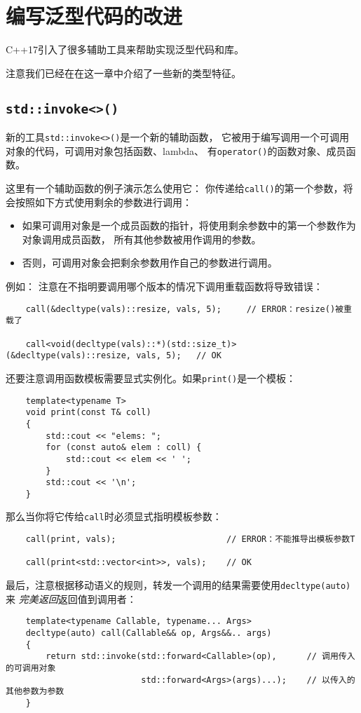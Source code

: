\chapter{编写泛型代码的改进}\label{ch33}
C++17引入了很多辅助工具来帮助实现泛型代码和库。

注意我们已经在在这一章中介绍了一些新的类型特征。


\section{\texttt{std::invoke<>()}}\label{ch33.1}
新的工具\texttt{std::invoke<>()}是一个新的辅助函数，
它被用于编写调用一个可调用对象的代码，可调用对象包括函数、lambda、
有\texttt{operator()}的函数对象、成员函数。

这里有一个辅助函数的例子演示怎么使用它：
你传递给\texttt{call()}的第一个参数，将会按照如下方式使用剩余的参数进行调用：
\begin{itemize}
    \item 如果可调用对象是一个成员函数的指针，将使用剩余参数中的第一个参数作为对象调用成员函数，
    所有其他参数被用作调用的参数。
    \item 否则，可调用对象会把剩余参数用作自己的参数进行调用。
\end{itemize}
例如：
注意在不指明要调用哪个版本的情况下调用重载函数将导致错误：
\begin{lstlisting}
    call(&decltype(vals)::resize, vals, 5);     // ERROR：resize()被重载了

    call<void(decltype(vals)::*)(std::size_t)>(&decltype(vals)::resize, vals, 5);   // OK
\end{lstlisting}
还要注意调用函数模板需要显式实例化。如果\texttt{print()}是一个模板：
\begin{lstlisting}
    template<typename T>
    void print(const T& coll)
    {
        std::cout << "elems: ";
        for (const auto& elem : coll) {
            std::cout << elem << ' ';
        }
        std::cout << '\n';
    }
\end{lstlisting}
那么当你将它传给\texttt{call}时必须显式指明模板参数：
\begin{lstlisting}
    call(print, vals);                      // ERROR：不能推导出模板参数T

    call(print<std::vector<int>>, vals);    // OK
\end{lstlisting}
最后，注意根据移动语义的规则，转发一个调用的结果需要使用\texttt{decltype(auto)}来
\emph{完美返回}返回值到调用者：
\begin{lstlisting}
    template<typename Callable, typename... Args>
    decltype(auto) call(Callable&& op, Args&&.. args)
    {
        return std::invoke(std::forward<Callable>(op),      // 调用传入的可调用对象
                           std::forward<Args>(args)...);    // 以传入的其他参数为参数
    }
\end{lstlisting}


